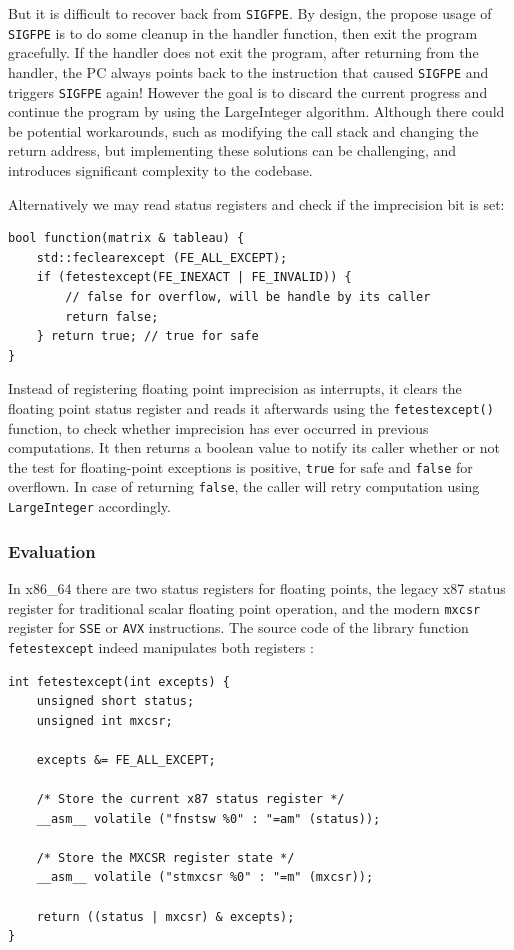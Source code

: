 \documentclass[logo,bsc,singlespacing,parskip]{infthesis}
\newcommand{\sigfpe}{\texttt{SIGFPE}}
\newcommand{\mxcsr}{\texttt{mxcsr}}
\begin{document}
But it is difficult to recover back from \sigfpe{}. By design, the propose usage
of \sigfpe{} is to do some cleanup in the handler function, then exit the program
gracefully. If the handler does not exit the program, after returning from the
handler, the PC always points back to the instruction that caused \sigfpe{} and
triggers \sigfpe{} again! However the goal is to discard the current progress and
continue the program by using the LargeInteger algorithm. Although there could
be potential workarounds, such as modifying the call stack and changing the
return address, but implementing these solutions can be challenging, and
introduces significant complexity to the codebase.

Alternatively we may read status registers and check if the imprecision bit is
set: 
\begin{verbatim}
bool function(matrix & tableau) {
    std::feclearexcept (FE_ALL_EXCEPT);
    if (fetestexcept(FE_INEXACT | FE_INVALID)) {
        // false for overflow, will be handle by its caller
        return false; 
    } return true; // true for safe
}
\end{verbatim}

Instead of registering floating point imprecision as interrupts, it clears the
floating point status register and reads it afterwards using the
\texttt{fetestexcept()} function, to check whether imprecision has ever occurred
in previous computations. It then returns a boolean value to notify its caller
whether or not the test for floating-point exceptions is positive, \texttt{true}
for safe and \texttt{false} for overflown. In case of returning \texttt{false}, 
the caller will retry computation using \texttt{LargeInteger} accordingly. 



\subsubsection{Evaluation}
In x86\_64 there are two status registers for floating points, the legacy x87
status register for traditional scalar floating point operation, and the modern
\mxcsr{} register for \texttt{SSE} or \texttt{AVX} instructions. The source code
of the library function \texttt{fetestexcept} indeed manipulates both registers
\cite{fenvlib}: 
\begin{verbatim}
int fetestexcept(int excepts) {
    unsigned short status;
    unsigned int mxcsr;

    excepts &= FE_ALL_EXCEPT;

    /* Store the current x87 status register */
    __asm__ volatile ("fnstsw %0" : "=am" (status));

    /* Store the MXCSR register state */
    __asm__ volatile ("stmxcsr %0" : "=m" (mxcsr));

    return ((status | mxcsr) & excepts);
}
\end{verbatim}
\end{document}
